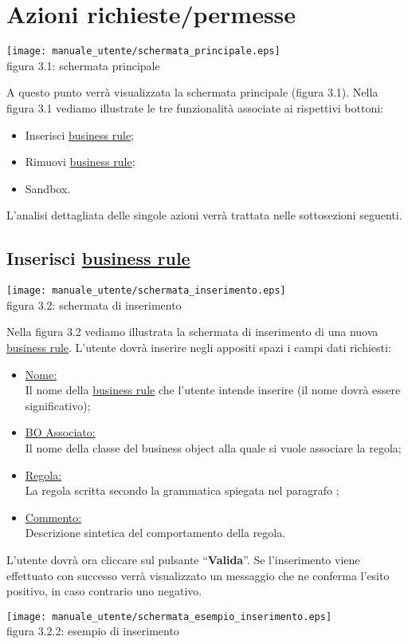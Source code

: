 \section{Azioni richieste/permesse}
\begin{center}
\texttt{[image: manuale\_utente/schermata\_principale.eps]}\\
 figura 3.1: schermata principale
\end{center}
A questo punto verr\`a visualizzata la schermata principale (figura 3.1).
Nella figura 3.1 vediamo illustrate le tre funzionalit\`a associate ai rispettivi bottoni:
\begin{itemize}
\item Inserisci \underline{business rule};
\item Rimuovi \underline{business rule};
\item Sandbox.
\end{itemize}
L'analisi dettagliata delle singole azioni verr\`a trattata nelle sottosezioni seguenti.
\subsection{Inserisci \underline{business rule}}
\begin{center}
\texttt{[image: manuale\_utente/schermata\_inserimento.eps]}\\
 figura 3.2: schermata di inserimento
\end{center}
Nella figura 3.2 vediamo illustrata la schermata di inserimento di una nuova \underline{business rule}. L'utente dovr\`a inserire negli appositi spazi i campi dati richiesti:
\begin{itemize}
\item \underline{Nome:} \\
Il nome della \underline{business rule} che l'utente intende inserire (il nome dovr\`a essere significativo);
\item \underline{BO Associato:} \\
Il nome della classe del business object alla quale si vuole associare la regola;
\item \underline{Regola:} \\
 La regola scritta secondo la grammatica spiegata nel paragrafo \Grammatica;
\item \underline{Commento:} \\
Descrizione sintetica del comportamento della regola. 
\end{itemize}
L'utente dovr\`a ora cliccare sul pulsante ``\textbf{Valida}''. Se l'inserimento viene effettuato con successo verr\`a visualizzato un messaggio che ne conferma l'esito positivo, in caso contrario uno negativo. 
\begin{center}
\texttt{[image: manuale\_utente/schermata\_esempio\_inserimento.eps]}\\
 figura 3.2.2: esempio di inserimento
\end{center} 
